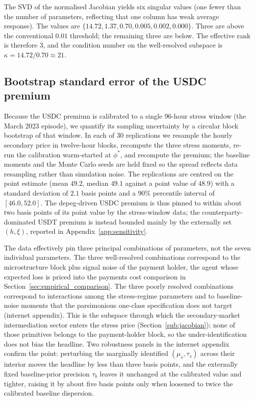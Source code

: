 The SVD of the normalised Jacobian yields six singular values (one fewer than the number of parameters, reflecting that one column has weak average response). The values are $\{14.72, 1.37, 0.70, 0.005, 0.002, 0.000\}$. Three are above the conventional $0.01$ threshold; the remaining three are below. The effective rank is therefore $3$, and the condition number on the well-resolved subspace is $\kappa = 14.72/0.70 \approx 21$.

\subsection{Bootstrap standard error of the USDC premium}\label{sub:bootstrap}

Because the USDC premium is calibrated to a single 96-hour stress window (the March 2023 episode), we quantify its sampling uncertainty by a circular block bootstrap of that window. In each of 30 replications we resample the hourly secondary price in twelve-hour blocks, recompute the three stress moments, re-run the calibration warm-started at $\phi^*$, and recompute the premium; the baseline moments and the Monte Carlo seeds are held fixed so the spread reflects data resampling rather than simulation noise. The replications are centred on the point estimate (mean $49.2$, median $49.1$ against a point value of $48.9$) with a standard deviation of $2.1$ basis points and a $90\%$ percentile interval of $[46.0, 52.0]$. The depeg-driven USDC premium is thus pinned to within about two basis points of its point value by the stress-window data; the counterparty-dominated USDT premium is instead bounded mainly by the externally set $(h,\xi)$, reported in Appendix~\ref{app:sensitivity}.

The data effectively pin three principal combinations of parameters, not the seven individual parameters. The three well-resolved combinations correspond to the microstructure block plus signal noise of the payment holder, the agent whose expected loss is priced into the payments cost comparison in Section~\ref{sec:empirical_comparison}. The three poorly resolved combinations correspond to interactions among the stress-regime parameters and to baseline-noise moments that the parsimonious one-class specification does not target (internet appendix). This is the subspace through which the secondary-market intermediation sector enters the stress price (Section~\ref{sub:jacobian}); none of those primitives belongs to the payment-holder block, so the under-identification does not bias the headline. Two robustness panels in the internet appendix confirm the point: perturbing the marginally identified $(\mu_s, \tau_s)$ across their interior moves the headline by less than three basis points, and the externally fixed baseline-prior precision $\tau_b$ leaves it unchanged at the calibrated value and tighter, raising it by about five basis points only when loosened to twice the calibrated baseline dispersion.

